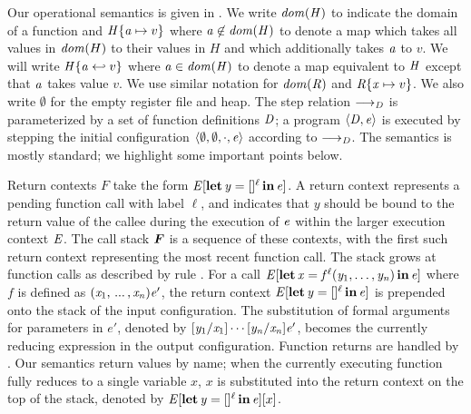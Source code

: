 Our operational semantics is given in .
We write $ \mathit{dom}( \mathit{H} ) $ to indicate the domain of
a function and $\mathit{H}  \{  \mathit{a}  \mapsto  v  \}$ where $ \mathit{a}  \not\in   \mathit{dom}( \mathit{H} )  $ to denote a map
which takes all values in $\mathit{dom}(H)$ to their values in $H$ and which
additionally takes $\mathit{a}$ to $v$.
We will write $ \mathit{H}  \{  \mathit{a}  \hookleftarrow  v  \}$
where $ \mathit{a}  \in   \mathit{dom}( \mathit{H} )  $ to denote a map equivalent to $\mathit{H}$ except that $\mathit{a}$ takes value $v$.
We use similar notation for $ \mathit{dom}( \mathit{R} ) $ and $\mathit{R}  \{  \mathit{x}  \mapsto  v  \}$.
We also write $\emptyset$ for the empty register file and heap.
%
The step relation  $ \longrightarrow _{ \mathit{D} } $ is parameterized
by a set of function definitions $\mathit{D}$; a program $ \left\langle{ \mathit{D} ,  \mathit{e} }\right\rangle $ is executed
by stepping the initial configuration $ \left\langle{  \emptyset  ,   \emptyset  ,   \cdot  ,  \mathit{e} }\right\rangle $ according
to $\longrightarrow_{\mathit{D}}$.
The semantics is mostly standard; we highlight some important points below.

Return contexts $F$ take the form $\mathit{E}  [   \operatorname{\mathbf{let}}  \mathit{y}  =   []^ \ell   \operatorname{\mathbf{in}}  \mathit{e}   ]$. A return context represents a pending
function call with label $\ell$, and indicates that $\mathit{y}$ should be bound to
the return value of the callee during the execution of $\mathit{e}$ within the larger execution context $\mathit{E}$.
The call stack $\oldvec{F}$ is a sequence of these contexts, with
the first such return context representing the most recent function call.
The stack grows at function calls as described by rule .
For a call $\mathit{E}  [   \operatorname{\mathbf{let}}  \mathit{x}  =   \mathit{f} ^ \ell (  \mathit{y_{{\mathrm{1}}}} ,\ldots, \mathit{y_{\mathit{n}}}  )   \operatorname{\mathbf{in}}  \mathit{e}   ]$ where
$f$ is defined as $(  \mathit{x_{{\mathrm{1}}}}  , \, ... \, ,  \mathit{x_{\mathit{n}}}  )  \mathit{e'}$, the return context $\mathit{E}  [   \operatorname{\mathbf{let}}  \mathit{y}  =   []^ \ell   \operatorname{\mathbf{in}}  \mathit{e}   ]$ is
prepended onto the stack of the input configuration.
The substitution of formal arguments for parameters in $e'$, denoted by $   [  \mathit{y_{{\mathrm{1}}}}  /  \mathit{x_{{\mathrm{1}}}}  ]  \cdots  [  \mathit{y_{\mathit{n}}}  /  \mathit{x_{\mathit{n}}}  ]     \mathit{e'} $,
becomes the currently reducing expression in the output configuration.
Function returns are handled by .
Our semantics return values by name; when the currently executing function fully reduces to a single variable $x$,
$x$ is substituted into the return context on the top of the stack,
denoted by $\mathit{E}  [   \operatorname{\mathbf{let}}  \mathit{y}  =   []^ \ell   \operatorname{\mathbf{in}}  \mathit{e}   ][x]$.

